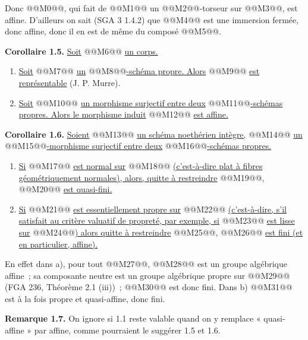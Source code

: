 
Donc @@M0@@, qui fait de @@M1@@ un @@M2@@-torseur sur @@M3@@, est affine. D'ailleurs on sait (SGA 3 1.4.2) que @@M4@@ est une immersion fermée, donc affine, donc il en est de même du composé @@M5@@.

\textbf{Corollaire 1.5.} \uline{Soit} @@M6@@ \uline{un corps.}
\begin{enumerate}[label=\alph*)]
\item \uline{Soit} @@M7@@ \uline{un} @@M8@@\uline{-schéma propre. Alors} @@M9@@ \uline{est représentable} (J. P. Murre).
\item \uline{Soit} @@M10@@ \uline{un morphisme surjectif entre deux} @@M11@@\uline{-schémas propres. Alors le morphisme induit} @@M12@@ \uline{est affine.}
\end{enumerate}

\textbf{Corollaire 1.6.} \uline{Soient} @@M13@@ \uline{un schéma noethérien intègre,} @@M14@@ \uline{un} @@M15@@\uline{-morphisme surjectif entre deux} @@M16@@\uline{-schémas propres.}
\begin{enumerate}[label=\alph*)]
\item \uline{Si} @@M17@@ \uline{est normal sur} @@M18@@ \uline{(c'est-à-dire plat à fibres géométriquement normales), alors, quitte à restreindre} @@M19@@, @@M20@@ \uline{est quasi-fini.}
\item \uline{Si} @@M21@@ \uline{est essentiellement propre sur} @@M22@@ \uline{(c'est-à-dire, s'il satisfait au critère valuatif de propreté, par exemple, si} @@M23@@ \uline{est lisse sur} @@M24@@\uline{) alors quitte à restreindre} @@M25@@, @@M26@@ \uline{est fini (et en particulier, affine).}
\end{enumerate}

En effet dans a), pour tout @@M27@@, @@M28@@ est un groupe algébrique affine~; sa composante neutre est un groupe algébrique propre sur @@M29@@ (FGA 236, Théorème 2.1 (iii))~; @@M30@@ est donc fini. Dans b) @@M31@@ est à la fois propre et quasi-affine, donc fini.

\textbf{Remarque 1.7.} On ignore si 1.1 reste valable quand on y remplace « quasi-affine » par affine, comme pourraient le suggérer 1.5 et 1.6.

